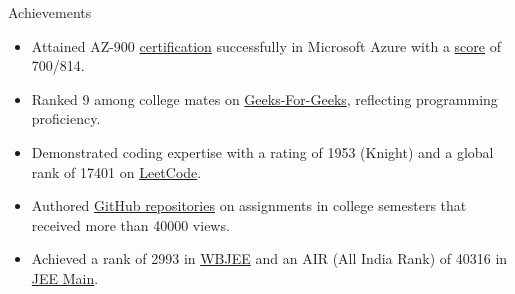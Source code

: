 \documentclass{resume} %
\begin{document}
\begin{rSection}{Achievements} 
\begin{itemize}
\setlength\itemsep{-1.75em} %
     \item Attained AZ-900 \href{https://learn.microsoft.com/en-in/users/arkapratimghosh-4932/credentials/certification-o-/azure-fundamentals}{certification} successfully in Microsoft Azure with a \href{https://drive.google.com/file/d/1s7vbb-FW7VGSNXz2BCDkJnFmuanPQLEC/view}{score} of 700/814. \\
    \item   Ranked 9 among college mates on \href{https://www.geeksforgeeks.org/user/arkapratimghosh20021/?utm_source=geeksforgeeks&utm_medium=my_profile&utm_campaign=auth_user}{Geeks-For-Geeks}, reflecting programming proficiency. \\
    \item Demonstrated coding expertise with a rating of 1953 (Knight) and a global rank of 17401 on \href{https://leetcode.com/21Arka2002/}{LeetCode}. \\
    \item Authored \href{https://github.com/arkapg211002/TotalViewsProjectRepoReadme}{GitHub repositories} on assignments in college semesters that received more than 40000 views. \\
    \item Achieved a rank of 2993 in \href{https://drive.google.com/file/d/1xc6hvBjQhrxccVi4ENYZc62iL98IfvNh/view}{WBJEE} and an AIR (All India Rank) of 40316 in \href{https://drive.google.com/file/d/1xjdXfsoL_L62ij-P8jDuyyKQw9I1_Ht0/view}{JEE Main}.
\end{itemize}

% 

\end{rSection}




\end{document}
